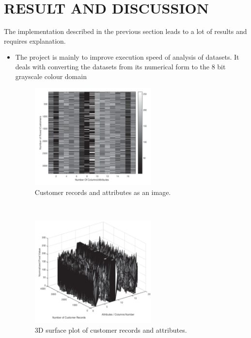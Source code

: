 

\chapter{RESULT AND DISCUSSION}

\hspace{0.9cm} The implementation described in the previous section leads to a lot of results and requires explanation.

\begin{itemize}
	\item The project is mainly to improve execution speed of analysis of datasets. It deals with converting the datasets from its numerical form to the 8 bit grayscale colour domain\\
	\begin{figure}[h!]
		\centering	
		\includegraphics[width=2.5in]{1.png} %
		\caption{Customer records and attributes as an image.}
		\label{fig:1} %
		
	\end{figure}\\
	\begin{figure}[h!]
		\centering	
		\includegraphics[width=2.5in]{2.png} %
		\caption{ 3D surface plot of customer records and attributes.}
		\label{fig:2} %
		

\end{figure}
\end{itemize}
